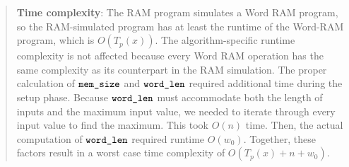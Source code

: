 \documentclass[11pt]{article}
\begin{document}
\begin{enumerate}
\begin{quote}
    \newline
    \newline
    \textbf{Time complexity}: \newline
    The RAM program simulates a Word RAM program, so the RAM-simulated program has at least the runtime of the Word-RAM program, which is $O(T_p(x))$. The algorithm-specific runtime complexity is not affected because every Word RAM operation has the same complexity as its counterpart in the RAM simulation. \newline 
    The proper calculation of $\texttt{mem\_size}$ and $\texttt{word\_len}$ required additional time during the setup phase. Because $\texttt{word\_len}$ must accommodate both the length of inputs and the maximum input value, we needed to iterate through every input value to find the maximum. This took $O(n)$ time. Then, the actual computation of $\texttt{word\_len}$ required runtime $O(w_0)$. \newline 
    Together, these factors result in a worst case time complexity of $O(T_p(x) + n + w_0)$.
    
\end{quote}



\end{enumerate}
\end{document}
